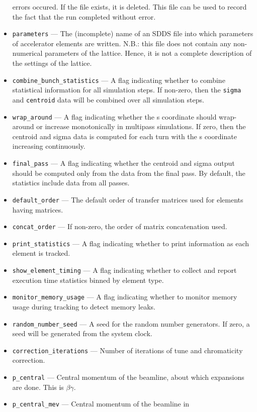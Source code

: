 \documentclass[11pt]{article}
\begin{document}
\begin{itemize}
errors occured.  If the file exists, it is deleted.  This file can be
used to record the fact that the run completed without error.
\item \verb|parameters| --- The (incomplete) name of an SDDS file into
which parameters of accelerator elements are written.
N.B.: this file does not contain any non-numerical parameters of the lattice.
Hence, it is not a complete description of the settings of the lattice.
\item \verb|combine_bunch_statistics| --- A flag indicating whether to
combine statistical information for all simulation steps.  If
non-zero, then the \verb|sigma| and \verb|centroid| data will be
combined over all simulation steps.
\item \verb|wrap_around| --- A flag indicating whether the s
 coordinate should wrap-around or increase monotonically in multipass
 simulations.  If zero, then the centroid and sigma data is computed for
 each turn with the s coordinate increasing continuously.
\item \verb|final_pass| --- A flag indicating whether the centroid and
 sigma output should be computed only from the data from the final pass.
 By default, the statistics include data from all passes.
\item \verb|default_order| --- The default order of transfer matrices
used for elements having matrices.
\item \verb|concat_order| --- If non-zero, the order of matrix
concatenation used.
\item \verb|print_statistics| --- A flag indicating whether to print
information as each element is tracked.
\item \verb|show_element_timing| --- A flag indicating whether to collect and report execution time statistics binned by element type.
\item \verb|monitor_memory_usage| --- A flag indicating whether to monitor memory usage during tracking to detect memory leaks.
\item \verb|random_number_seed| --- A seed for the random number generators.  If zero, a seed will be generated from the system clock.
\item \verb|correction_iterations| --- Number of iterations of tune and chromaticity correction.
\item \verb|p_central| --- Central momentum of the beamline, about which expansions are done.
        This is $\beta\gamma$.
\item \verb|p_central_mev| --- Central momentum of the beamline in

\end{itemize}
\end{document}
